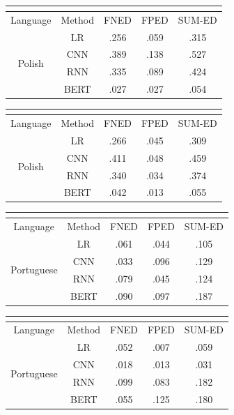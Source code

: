 \begin{table}[htp]
\begin{tabular}{cc|ccc}
\multicolumn{5}{c}{} \\\hline\hline
Language & Method & FNED & FPED & SUM-ED \\\hline
\multirow{4}{*}{Polish} & LR & .256 & .059 & .315 \\
 & CNN  & .389 & .138 & .527 \\
 & RNN  & .335 & .089 & .424 \\
 & BERT & .027 & .027 & .054
\end{tabular}
\quad
\begin{tabular}{cc|ccc}
\multicolumn{5}{c}{} \\\hline\hline
Language & Method & FNED & FPED & SUM-ED \\\hline
\multirow{4}{*}{Polish} & LR & .266 & .045 & .309 \\
 & CNN  & .411 & .048 & .459 \\
 & RNN  & .340 & .034 & .374 \\
 & BERT & .042 & .013 & .055
\end{tabular}

\begin{tabular}{cc|ccc}
\multicolumn{5}{c}{} \\\hline\hline
Language & Method & FNED & FPED & SUM-ED \\\hline
\multirow{4}{*}{Portuguese} & LR  & .061 & .044 & .105 \\
 & CNN  & .033 & .096 & .129 \\
 & RNN  & .079 & .045 & .124 \\
 & BERT & .090 & .097 & .187 
\end{tabular}
\quad
\begin{tabular}{cc|ccc}
\multicolumn{5}{c}{} \\\hline\hline
Language & Method & FNED & FPED & SUM-ED \\\hline
\multirow{4}{*}{Portuguese} & LR  & .052 & .007 & .059 \\
 & CNN  & .018 & .013 & .031 \\
 & RNN  & .099 & .083 & .182 \\
 & BERT & .055 & .125 & .180
\end{tabular}


\end{table}
